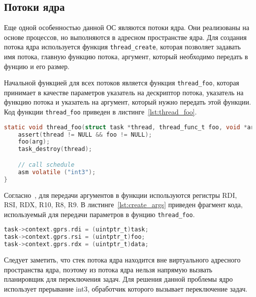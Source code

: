 \subsection{Потоки ядра}
Еще одной особенностью данной ОС являются потоки ядра. Они реализованы на основе процессов, но
выполняются в адресном пространстве ядра. Для создания потока ядра используется функция \texttt{thread\_create},
которая позволяет задавать имя потока, главную функцию потока, аргумент, который необходимо передать в фунцию
и его размер.

Начальной функцией для всех потоков является функция \texttt{thread\_foo}, которая принимает в качестве
параметров указатель на дескриптор потока, указатель на функцию потока и указатель на аргумент, который
нужно передать этой функции. Код функции \texttt{thread\_foo} приведен в листинге~\ref{lst:thread_foo}.

\begin{lstlisting}[language=C,
caption={Точка входа потоков ядра},
label={lst:thread_foo}]
static void thread_foo(struct task *thread, thread_func_t foo, void *arg) {
	assert(thread != NULL && foo != NULL);
	foo(arg);
	task_destroy(thread);

	// call schedule
	asm volatile ("int3");
}
\end{lstlisting}

Согласно~\cite{x86_64_abi}, для передачи аргументов в функции используются регистры RDI, RSI, RDX, R10, R8, R9.
В листинге~\ref{lst:create_args} приведен фрагмент кода, используемый для передачи параметров в фунцию \texttt{thread\_foo}.

\begin{lstlisting}[language=C,
caption={Передача параметров в функцию \texttt{thread\_foo}},
label={lst:create_args}]
task->context.gprs.rdi = (uintptr_t)task;
task->context.gprs.rsi = (uintptr_t)foo;
task->context.gprs.rdx = (uintptr_t)data;
\end{lstlisting}


Следует заметить, что стек потока ядра находится вне виртуального адресного пространства ядра,
поэтому из потока ядра нельзя напрямую вызвать планировщик для переключения задач. Для решения данной
проблемы ядро использует прерывание int3, обработчик которого вызывает переключение задач.

